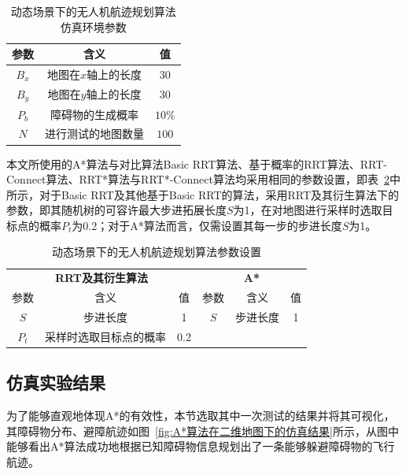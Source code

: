 \begin{table}[!htbp]
    \caption{动态场景下的无人机航迹规划算法仿真环境参数}
    \label{tab:实时避障算法仿真环境参数}
    \centering
    \begin{tabular}{c c c}
        \toprule
        \textbf{参数} & \textbf{含义} & \textbf{值}\\
        \midrule
        \(B_x\) & 地图在\(x\)轴上的长度 & \(30\) \\
        \(B_y\) & 地图在\(y\)轴上的长度 & \(30\) \\
        \(P_b\) & 障碍物的生成概率 & \(10\%\) \\
        \(N\) & 进行测试的地图数量 & \(100\) \\
        \bottomrule
    \end{tabular}
\end{table}

本文所使用的A*算法与对比算法Basic RRT算法、基于概率的RRT算法、RRT-Connect算法、RRT*算法与RRT*-Connect算法均采用相同的参数设置，即表~\ref{tab:实时避障算法参数设置}中所示，对于Basic RRT及其他基于Basic RRT的算法，采用RRT及其衍生算法下的参数，即其随机树的可容许最大步进拓展长度\(S\)为1，在对地图进行采样时选取目标点的概率\(P_t\)为0.2；对于A*算法而言，仅需设置其每一步的步进长度\(S\)为1。

\begin{table}[!htbp]
    \caption{动态场景下的无人机航迹规划算法参数设置}
    \label{tab:实时避障算法参数设置}
    \centering
    \begin{tabular}{c c c c c c}
        \toprule
        \multicolumn{3}{c}{\textbf{RRT及其衍生算法}} & \multicolumn{3}{c}{\textbf{A*}} \\
        \cmidrule(lr){1-3} \cmidrule(lr){4-6}
        参数 & 含义 & 值 & 参数 & 含义 & 值 \\
        \midrule
        \( S \) & 步进长度 & 1 & \( S \) & 步进长度 & 1 \\
        \( P_t \) & 采样时选取目标点的概率 & 0.2 & & & \\
        \bottomrule
    \end{tabular}
\end{table}

\subsection{仿真实验结果}

为了能够直观地体现A*的有效性，本节选取其中一次测试的结果并将其可视化，其障碍物分布、避障航迹如图~\ref{fig:A*算法在二维地图下的仿真结果}所示，从图中能够看出A*算法成功地根据已知障碍物信息规划出了一条能够躲避障碍物的飞行航迹。

